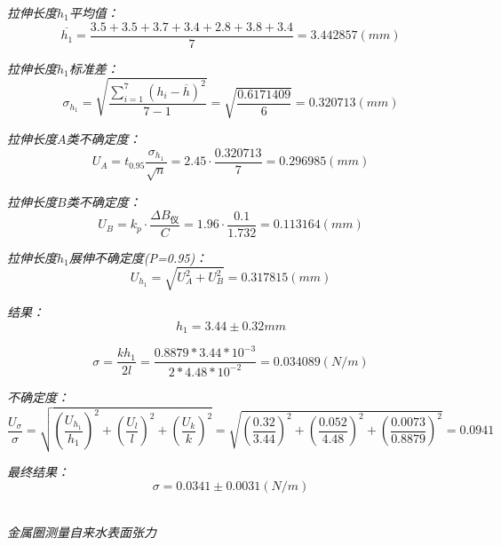 \documentclass[UTF8]{ctexart}
\begin{document}
    \emph{拉伸长度$h_1$平均值：}
    \begin{equation*}
        \overline{h_1}=\frac{3.5+	3.5	+3.7+	3.4	+2.8+	3.8	+3.4}{7} =3.442857 (mm)
    \end{equation*}

    \emph{拉伸长度$h_1$标准差：}
    \begin{equation*}
        \sigma _{h_1}=\sqrt{\frac{\sum_{i=1}^7(h_i-\overline{h})^2}{7-1}} =\sqrt{\frac{0.6171409}{6}}=0.320713(mm)
    \end{equation*}

    \emph{拉伸长度$A$类不确定度：}
    \begin{equation*}
        U_A=t_{0.95}\frac{\sigma_{h_1}}{\sqrt{n}}=2.45·\frac{0.320713}{7}=0.296985(mm)
    \end{equation*}

    \emph{拉伸长度$B$类不确定度：}
    \begin{equation*}
        U_B=k_p·\frac{\varDelta B_仪}{C}=1.96·\frac{0.1}{1.732}=0.113164(mm)
    \end{equation*}

    \emph{拉伸长度$h_1$展伸不确定度(P=0.95)：}
    \begin{equation*}
       U_{h_1}=\sqrt{U_A^2+U_B^2}= 0.317815(mm)
    \end{equation*}

    \emph{结果：}
    \begin{equation*}
        h_1=3.44±0.32mm
    \end{equation*}

    \begin{equation*}
        \sigma = \frac{kh_1}{2l} = \frac{0.8879*3.44*10^{-3}}{2*4.48*10^{-2}} = 0.034089(N/m)
    \end{equation*}
    
    \emph{不确定度：}
    \begin{equation*}
        \frac{U_{\sigma}}{\sigma}=\sqrt{(\frac{U_{h_1}}{h_1})^2+(\frac{U_l}{l})^2+(\frac{U_k}{k})^2}=
        \sqrt{(\frac{0.32}{3.44})^2+(\frac{0.052}{4.48})^2+(\frac{0.0073}{0.8879})^2}= 0.0941 
    \end{equation*}

    \emph{最终结果：}
    \begin{equation}
        \sigma=0.0341±0.0031(N/m)
    \end{equation}



    \begin{center}
        \emph{\\[0.01cm]金属圈测量自来水表面张力}
    \end{center}
\end{document}

